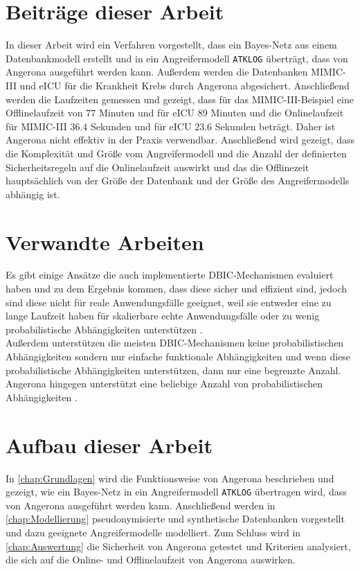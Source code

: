 \documentclass[german,version-2020-11]{uzl-thesis}
\begin{document}
\section{Beiträge dieser Arbeit}
In dieser Arbeit wird ein Verfahren vorgestellt, dass ein Bayes-Netz aus einem Datenbankmodell erstellt und in ein Angreifermodell \texttt{ATKLOG} überträgt, dass von Angerona ausgeführt werden kann. Außerdem werden die Datenbanken MIMIC-III und eICU für die Krankheit Krebs durch Angerona abgesichert. Anschließend werden die Laufzeiten gemessen und gezeigt, dass für das MIMIC-III-Beispiel eine Offlinelaufzeit von $77$ Minuten und für eICU $89$ Minuten und die Onlinelaufzeit für MIMIC-III $36.4$ Sekunden und für eICU $23.6$ Sekunden beträgt. Daher ist Angerona nicht effektiv in der Praxis verwendbar. Anschließend wird gezeigt, dass die Komplexität und Größe vom Angreifermodell und die Anzahl der definierten Sicherheitsregeln auf die Onlinelaufzeit auswirkt und das die Offlinezeit hauptsächlich von der Größe der Datenbank und der Größe des Angreifermodells abhängig ist.

\section{Verwandte Arbeiten}
Es gibt einige Ansätze die auch implementierte DBIC-Mechanismen evaluiert haben und zu dem Ergebnis kommen, dass diese sicher und effizient sind, jedoch sind diese nicht für reale Anwendungsfälle geeignet, weil sie entweder eine zu lange Laufzeit haben für skalierbare echte Anwendungsfälle oder zu wenig probabilistische Abhängigkeiten unterstützen \cite{24,guarnieri2017securing}. \\ 
Außerdem unterstützen die meisten DBIC-Mechanismen keine probabilistischen Abhängigkeiten sondern nur einfache funktionale Abhängigkeiten und wenn diese probabilistische Abhängigkeiten unterstützen, dann nur eine begrenzte Anzahl. Angerona hingegen unterstützt eine beliebige Anzahl von probabilistischen Abhängigkeiten \cite{guarnieri2017securing}.

\section{Aufbau dieser Arbeit}
In \cref{chap:Grundlagen} wird die Funktionsweise von Angerona beschrieben und gezeigt, wie ein Bayes-Netz in ein Angreifermodell \texttt{ATKLOG} übertragen wird, dass von Angerona ausgeführt werden kann. Anschließend werden in  \cref{chap:Modellierung} pseudonymisierte und synthetische Datenbanken vorgestellt und dazu geeignete Angreifermodelle modelliert. Zum Schluss wird in \cref{chap:Auswertung} die Sicherheit von Angerona getestet und Kriterien analysiert, die sich auf die Online- und Offlinelaufzeit von Angerona auswirken.
\end{document}
